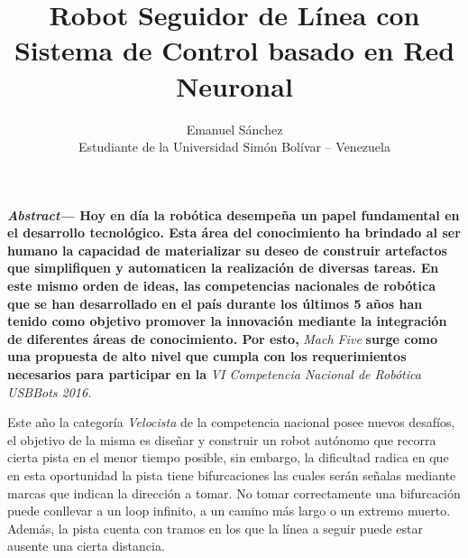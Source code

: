 \documentclass[10pt,twocolumn,legalpaper,draft]{article}
\begin{document}
\title{\textbf{\huge{Robot Seguidor de Línea con Sistema de Control basado en Red Neuronal}}}
\author{Emanuel Sánchez \\
\normalsize{Estudiante de la Universidad Simón Bolívar -- Venezuela}}
\date{}                       %
\pagestyle{empty}                               %
\maketitle                    %
\thispagestyle{empty} 

\textbf{\textit{Abstract--- } Hoy en día la robótica desempeña un papel fundamental en el desarrollo tecnológico. Esta área del conocimiento ha brindado al ser humano la capacidad de materializar su deseo de construir artefactos que simplifiquen y automaticen la realización de diversas tareas. En este mismo orden de ideas, las competencias nacionales de robótica que se han desarrollado en el país durante los últimos 5 años han tenido como objetivo promover la innovación mediante la integración de diferentes áreas de conocimiento. \newline \newline \indent Por esto,} \emph{Mach Five} \textbf{surge como una propuesta de alto nivel que cumpla con los requerimientos necesarios para participar en la} \emph{VI Competencia Nacional de Robótica USBBots 2016.}\newline
\vspace{0,8em}

\centerline{\Large{\textbf{}}} 
\vspace{0,8em}
Este año la categoría \emph{Velocista} de la competencia nacional posee nuevos desafíos, el objetivo de la misma es diseñar y construir un robot autónomo que recorra cierta pista en el menor tiempo posible, sin embargo, la dificultad radica en que en esta oportunidad la pista tiene bifurcaciones las cuales serán señalas mediante marcas que indican la dirección a tomar. No tomar correctamente una bifurcación puede conllevar a un loop infinito, a un camino más largo o un extremo muerto. Además, la pista cuenta con tramos en los que la línea a seguir puede estar ausente una cierta distancia. \newline
\vspace{0,8em}
\end{document}
